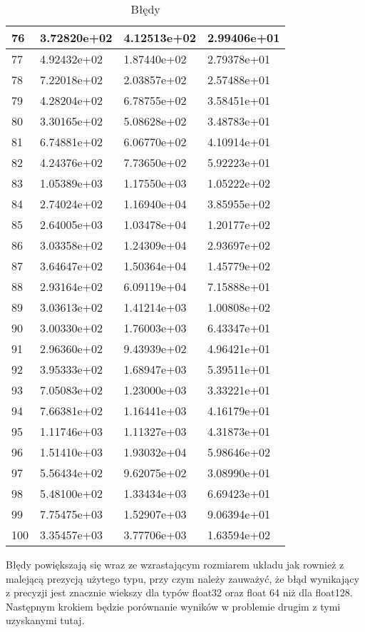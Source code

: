 \documentclass{article}
\begin{document}
\begin{table}[H]
{\begin{tabular}{|l|l|l|l|}
76 & 3.72820e+02 & 4.12513e+02 & 2.99406e+01 \\ \hline
77 & 4.92432e+02 & 1.87440e+02 & 2.79378e+01 \\ \hline
78 & 7.22018e+02 & 2.03857e+02 & 2.57488e+01 \\ \hline
79 & 4.28204e+02 & 6.78755e+02 & 3.58451e+01 \\ \hline
80 & 3.30165e+02 & 5.08628e+02 & 3.48783e+01 \\ \hline
81 & 6.74881e+02 & 6.06770e+02 & 4.10914e+01 \\ \hline
82 & 4.24376e+02 & 7.73650e+02 & 5.92223e+01 \\ \hline
83 & 1.05389e+03 & 1.17550e+03 & 1.05222e+02 \\ \hline
84 & 2.74024e+02 & 1.16940e+04 & 3.85955e+02 \\ \hline
85 & 2.64005e+03 & 1.03478e+04 & 1.20177e+02 \\ \hline
86 & 3.03358e+02 & 1.24309e+04 & 2.93697e+02 \\ \hline
87 & 3.64647e+02 & 1.50364e+04 & 1.45779e+02 \\ \hline
88 & 2.93164e+02 & 6.09119e+04 & 7.15888e+01 \\ \hline
89 & 3.03613e+02 & 1.41214e+03 & 1.00808e+02 \\ \hline
90 & 3.00330e+02 & 1.76003e+03 & 6.43347e+01 \\ \hline
91 & 2.96360e+02 & 9.43939e+02 & 4.96421e+01 \\ \hline
92 & 3.95333e+02 & 1.68947e+03 & 5.39511e+01 \\ \hline
93 & 7.05083e+02 & 1.23000e+03 & 3.33221e+01 \\ \hline
94 & 7.66381e+02 & 1.16441e+03 & 4.16179e+01 \\ \hline
95 & 1.11746e+03 & 1.11327e+03 & 4.31873e+01 \\ \hline
96 & 1.51410e+03 & 1.93032e+04 & 5.98646e+02 \\ \hline
97 & 5.56434e+02 & 9.62075e+02 & 3.08990e+01 \\ \hline
98 & 5.48100e+02 & 1.33434e+03 & 6.69423e+01 \\ \hline
99 & 7.75475e+03 & 1.52907e+03 & 9.06394e+01 \\ \hline
100 & 3.35457e+03 & 3.77706e+03 & 1.63594e+02 \\ \hline
\end{tabular}
\hspace*{-2.5cm}
}
\caption{Błędy}
\end{table}

Błędy powiększają się wraz ze wzrastającym rozmiarem układu jak rownież z malejącą prezycją użytego typu, przy czym należy
zauważyć, że błąd wynikający z precyzji jest znacznie wiekszy dla typów float32 oraz float 64 niż dla float128. Następnym krokiem
będzie porównanie wyników w problemie drugim z tymi uzyskanymi tutaj.
\end{document}
